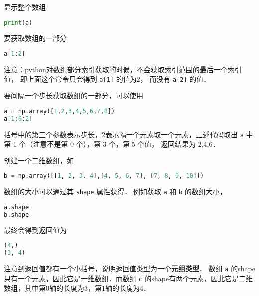 显示整个数组
\begin{lstlisting}[language=python]
print(a)
\end{lstlisting}
要获取数组的一部分
\begin{lstlisting}[language=python]
a[1:2]
\end{lstlisting}
注意：python对数组部分索引获取的时候，不会获取索引范围的最后一个索引值， 即上面这个命令只会得到 \verb|a[1]| 的值为2， 而没有 \verb|a[2]| 的值．

要间隔一个步长获取数组的一部分，可以使用
\begin{lstlisting}[language=python]
a = np.array([1,2,3,4,5,6,7,8])
a[1:6:2]
\end{lstlisting}
括号中的第三个参数表示步长，2表示隔一个元素取一个元素，上述代码取出 \verb|a| 中第 1 个（注意不是第 0 个），第  3 个，第 5 个值， 返回结果为 2,4,6．

创建一个二维数组，如
\begin{lstlisting}[language=python]
b = np.array([[1, 2, 3, 4],[4, 5, 6, 7], [7, 8, 9, 10]])
\end{lstlisting}
数组的大小可以通过其 \verb|shape| 属性获得． 例如获取 \verb|a| 和 \verb|b| 的数组大小，
\begin{lstlisting}[language=python]
a.shape
b.shape
\end{lstlisting}
最终会得到返回值为
\begin{lstlisting}[language=python]
(4,)
(3, 4)
\end{lstlisting}
注意到返回值都有一个小括号，说明返回值类型为一个\textbf{元组类型}． 数组 \verb|a| 的shape只有一个元素，因此它是一维数组．而数组 \verb|c| 的shape有两个元素，因此它是二维数组，其中第0轴的长度为3，第1轴的长度为4．


